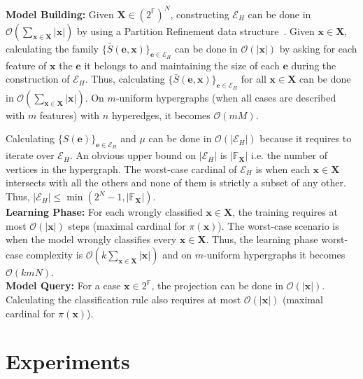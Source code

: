 \documentclass[preprint,12pt]{elsarticle}
\theoremstyle{definition}
\begin{document}
{\bf Model Building:} Given $\mathbf X \in ({2^{\mathbb F}})^N$, constructing $\mathcal{E}_H$ can be done in $\mathcal{O}(\underset{\mathbf x \in \mathbf X}{\sum}|\mathbf x|)$ by using a Partition Refinement data structure~\cite{Paige:1987:TPR:37185.37186}. Given $\mathbf x \in \mathbf X$, calculating the family $\{\bar S(\mathbf e, \mathbf x)\}_{\mathbf e \in \mathcal{E}_H}$ can be done in $\mathcal{O}(|\mathbf x|)$ by asking for each feature of $\mathbf x$ the $\mathbf e$ it belongs to and maintaining the size of each $\mathbf e$ during the construction of $\mathcal{E}_H$. Thus, calculating $\{\bar S(\mathbf e, \mathbf x)\}_{\mathbf e \in \mathcal{E}_H}$ for all $\mathbf x \in \mathbf X$ can be done in $\mathcal{O}(\underset{\mathbf x \in \mathbf X}{\sum}|\mathbf x|)$. On $m$-uniform hypergraphs (when all cases are described with $m$ features) with $n$ hyperedges, it becomes $\mathcal{O}(mM)$. 

Calculating $\{S(\mathbf e)\}_{\mathbf e \in \mathcal{E}_H}$ and $\mu$ can be done in $\mathcal{O}(|\mathcal{E}_H|)$ because it requires to iterate over $\mathcal{E}_H$. An obvious upper bound on $|\mathcal{E}_H|$ is $|\mathbb{F}_{\mathbf X}|$ i.e. the number of vertices in the hypergraph. The worst-case cardinal of $\mathcal{E}_H$ is when each $\mathbf x \in \mathbf X$ intersects with all the others and none of them is strictly a subset of any other. Thus, $|\mathcal{E}_H| \leq \min(2^N -1, |\mathbb{F}_{\mathbf X}|)$.\\

\noindent
{\bf Learning Phase:} For each wrongly classified $\mathbf x \in \mathbf X$, the training requires at most $\mathcal{O}(|\mathbf x|)$ steps (maximal cardinal for $\pi(\mathbf x)$). The worst-case scenario is when the model wrongly classifies every $\mathbf x \in \mathbf X$. Thus, the learning phase worst-case complexity is $\mathcal{O}(k \underset{\mathbf x \in \mathbf X}{\sum}|\mathbf x|)$ and on $m$-uniform hypergraphs it becomes $\mathcal{O}(k m N)$.\\

\noindent
{\bf Model Query:} For a case $\mathbf x \in 2^{\mathbb F}$, the projection can be done in $\mathcal{O}(|\mathbf x|)$. Calculating the classification rule also requires at most $\mathcal{O}(|\mathbf x|)$ (maximal cardinal for $\pi(\mathbf x)$).


\section{Experiments}
\label{sec:experiments}
\end{document}
